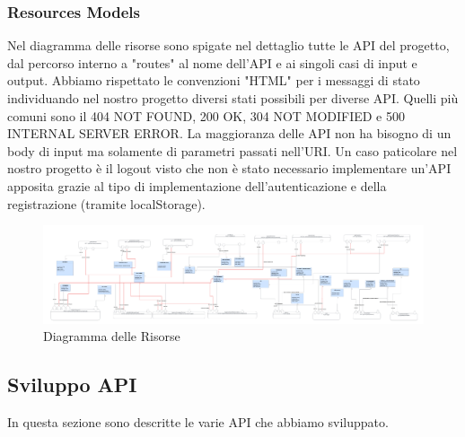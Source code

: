 \subsubsection{Resources Models}
Nel diagramma delle risorse sono spigate nel dettaglio tutte le API del progetto, dal percorso interno a "routes" al nome dell'API e ai singoli casi di input e output. Abbiamo rispettato le convenzioni "HTML" per i messaggi di stato individuando nel nostro progetto diversi stati possibili per diverse API. Quelli più comuni sono il 404 NOT FOUND, 200 OK, 304 NOT MODIFIED e 500 INTERNAL SERVER ERROR. La maggioranza delle API non ha bisogno di un body di input ma solamente di parametri passati nell'URI. Un caso paticolare nel nostro progetto è il logout visto che non è stato necessario implementare un'API apposita grazie al tipo di implementazione dell'autenticazione e della registrazione (tramite localStorage). 
\begin{figure}[!h]
\centering
\includegraphics[scale=0.1]{images/Resources Diagram.png}
\caption{Diagramma delle Risorse}
\label{fig:Resources Diagram.png}
\end{figure}

\newpage
\subsection{Sviluppo API}
In questa sezione sono descritte le varie API che abbiamo sviluppato.

